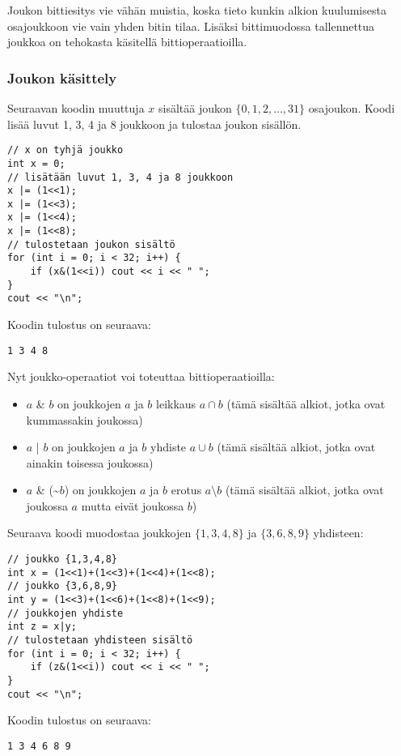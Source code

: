 Joukon bittiesitys vie vähän muistia,
koska tieto kunkin alkion kuulumisesta
osajoukkoon vie vain yhden bitin tilaa.
Lisäksi bittimuodossa tallennettua joukkoa
on tehokasta käsitellä bittioperaatioilla.

\subsubsection{Joukon käsittely}

Seuraavan koodin muuttuja $x$
sisältää joukon $\{0,1,2,\ldots,31\}$
osajoukon.
Koodi lisää luvut 1, 3, 4 ja 8
joukkoon ja tulostaa
joukon sisällön.

\begin{lstlisting}
// x on tyhjä joukko
int x = 0;
// lisätään luvut 1, 3, 4 ja 8 joukkoon
x |= (1<<1);
x |= (1<<3);
x |= (1<<4);
x |= (1<<8);
// tulostetaan joukon sisältö
for (int i = 0; i < 32; i++) {
    if (x&(1<<i)) cout << i << " ";
}
cout << "\n";
\end{lstlisting}
Koodin tulostus on seuraava:
\begin{lstlisting}
1 3 4 8
\end{lstlisting}

\noindent
Nyt joukko-operaatiot voi toteuttaa bittioperaatioilla:
\begin{itemize}
\item $a$ \& $b$ on joukkojen $a$ ja $b$ leikkaus $a \cap b$
(tämä sisältää alkiot,
jotka ovat kummassakin joukossa)
\item $a$ | $b$ on joukkojen $a$ ja $b$ yhdiste $a \cup b$
(tämä sisältää alkiot,
jotka ovat ainakin toisessa joukossa)
\item $a$ \& (\textasciitilde$b$) on joukkojen $a$ ja $b$ erotus
$a \setminus b$ (tämä sisältää alkiot,
jotka ovat joukossa $a$ mutta eivät joukossa $b$)
\end{itemize}

\noindent
Seuraava koodi muodostaa
joukkojen $\{1,3,4,8\}$ ja $\{3,6,8,9\}$ yhdisteen:

\begin{lstlisting}
// joukko {1,3,4,8}
int x = (1<<1)+(1<<3)+(1<<4)+(1<<8);
// joukko {3,6,8,9}
int y = (1<<3)+(1<<6)+(1<<8)+(1<<9);
// joukkojen yhdiste
int z = x|y;
// tulostetaan yhdisteen sisältö
for (int i = 0; i < 32; i++) {
    if (z&(1<<i)) cout << i << " ";
}
cout << "\n";
\end{lstlisting}
Koodin tulostus on seuraava:
\begin{lstlisting}
1 3 4 6 8 9
\end{lstlisting}

